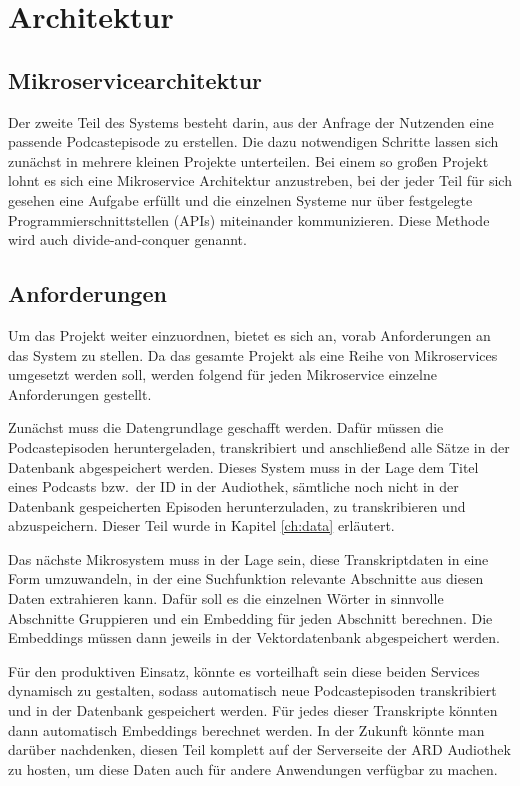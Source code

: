 \chapter{Architektur}\label{ch:method}

\section{Mikroservicearchitektur}

Der zweite Teil des Systems besteht darin, aus der Anfrage der Nutzenden eine passende Podcastepisode zu erstellen.
Die dazu notwendigen Schritte lassen sich zunächst in mehrere kleinen Projekte unterteilen. 
Bei einem so großen Projekt lohnt es sich eine Mikroservice Architektur anzustreben, bei der jeder Teil für sich gesehen eine Aufgabe erfüllt und die einzelnen Systeme nur über festgelegte Programmierschnittstellen (APIs) miteinander kommunizieren.
Diese Methode wird auch divide-and-conquer genannt. 



\section{Anforderungen}

Um das Projekt weiter einzuordnen, bietet es sich an, vorab Anforderungen an das System zu stellen. 
Da das gesamte Projekt als eine Reihe von Mikroservices umgesetzt werden soll, werden folgend für jeden Mikroservice einzelne Anforderungen gestellt.

Zunächst muss die Datengrundlage geschafft werden. 
Dafür müssen die Podcastepisoden heruntergeladen, transkribiert und anschließend alle Sätze in der Datenbank abgespeichert werden.
Dieses System muss in der Lage dem Titel eines Podcasts bzw.\ der ID in der Audiothek, sämtliche noch nicht in der Datenbank gespeicherten Episoden herunterzuladen, zu transkribieren und abzuspeichern.
Dieser Teil wurde in Kapitel \autoref{ch:data} erläutert.

Das nächste Mikrosystem muss in der Lage sein, diese Transkriptdaten in eine Form umzuwandeln, in der eine Suchfunktion relevante Abschnitte aus diesen Daten extrahieren kann.
Dafür soll es die einzelnen Wörter in sinnvolle Abschnitte Gruppieren und ein Embedding für jeden Abschnitt berechnen.
Die Embeddings müssen dann jeweils in der Vektordatenbank abgespeichert werden.

Für den produktiven Einsatz, könnte es vorteilhaft sein diese beiden Services dynamisch zu gestalten, sodass automatisch neue Podcastepisoden transkribiert und in der Datenbank gespeichert werden.
Für jedes dieser Transkripte könnten dann automatisch Embeddings berechnet werden.
In der Zukunft könnte man darüber nachdenken, diesen Teil komplett auf der Serverseite der ARD Audiothek zu hosten, um diese Daten auch für andere Anwendungen verfügbar zu machen.



